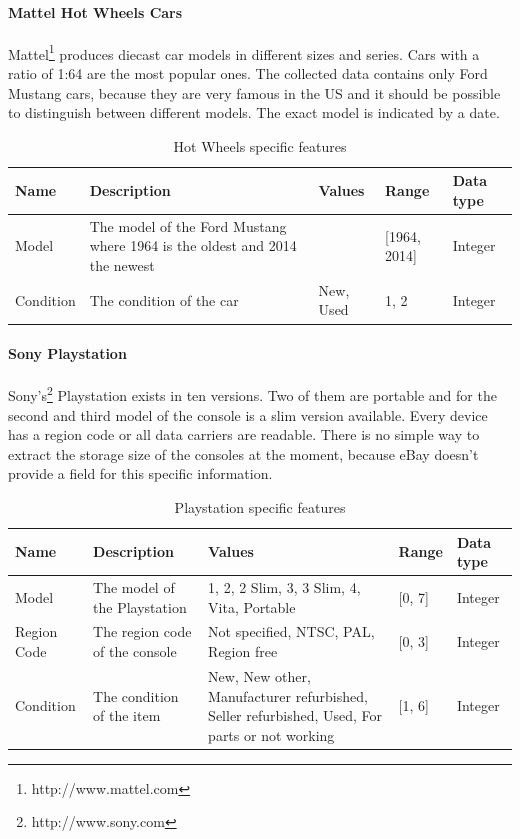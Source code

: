 \paragraph{Mattel Hot Wheels Cars}
Mattel\footnote{http://www.mattel.com} produces diecast car models in different sizes and series. Cars with a ratio of 1:64 are the most popular ones. The collected data contains only Ford Mustang cars, because they are very famous in the US and it should be possible to distinguish between different models. The exact model is indicated by a date.
\begin{table}[h!]
	\begin{center}
	\begin{tabular}{| p{2.6cm} | p{2.6cm} | p{2.6cm} | p{2.6cm} | p{2.6cm} |}
		\hline
		\textbf{Name} & \textbf{Description} & \textbf{Values} & \textbf{Range} & \textbf{Data type} \\
		\hline
		Model & The model of the Ford Mustang where 1964 is the oldest and 2014 the newest & & [1964, 2014] & Integer \\
		\hline
		Condition & The condition of the car & New, Used & {1, 2} & Integer \\
		\hline
	\end{tabular}
	\end{center}
	\caption{Hot Wheels specific features}
\end{table}

\paragraph{Sony Playstation}
Sony's\footnote{http://www.sony.com} Playstation exists in ten versions. Two of them are portable and for the second and third model of the console is a slim version available. Every device has a region code or all data carriers are readable. There is no simple way to extract the storage size of the consoles at the moment, because eBay doesn't provide a field for this specific information.
\begin{table}[h!]
	\begin{center}
	\begin{tabular}{| p{2.6cm} | p{2.6cm} | p{2.6cm} | p{2.6cm} | p{2.6cm} |}
		\hline
		\textbf{Name} & \textbf{Description} & \textbf{Values} & \textbf{Range} & \textbf{Data type} \\
		\hline
		Model & The model of the Playstation & 1, 2, 2 Slim, 3, 3 Slim, 4, Vita, Portable & [0, 7] & Integer \\
		\hline
		Region Code & The region code of the console & Not specified, NTSC, PAL, Region free & [0, 3] & Integer \\
		\hline
		Condition & The condition of the item & New, New other, Manufacturer refurbished, Seller refurbished, Used, For parts or not working & [1, 6] & Integer \\
		\hline
	\end{tabular}
	\end{center}
	\caption{Playstation specific features}
\end{table}

